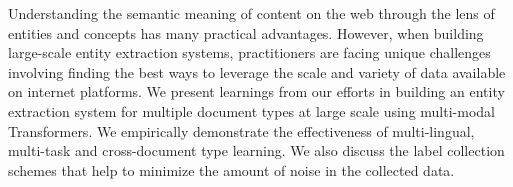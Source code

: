 Understanding the semantic meaning of content on the web through the lens of entities and concepts has many practical advantages. However, when building large-scale entity extraction systems, practitioners are facing unique challenges involving finding the best ways to leverage the scale and variety of data available on internet platforms. We present learnings from our efforts in building an entity extraction system for multiple document types at large scale using multi-modal Transformers. We empirically demonstrate the effectiveness of multi-lingual, multi-task and cross-document type learning. We also discuss the label collection schemes that help to minimize the amount of noise in the collected data.
